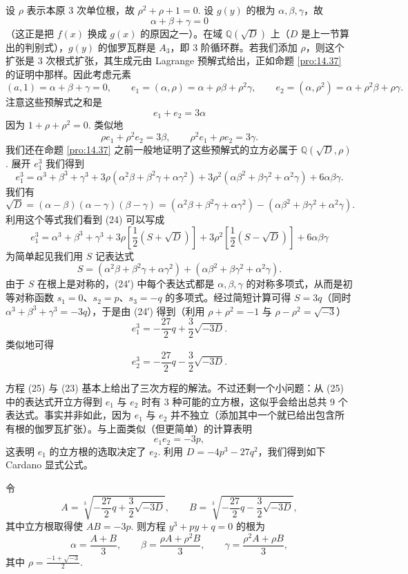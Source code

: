 设 \(\rho\) 表示本原 3 次单位根，故 \(\rho^2+\rho+1 = 0\). 设 \(g(y)\) 的根为 \(\alpha, \beta, \gamma\)，故
\[
\alpha+\beta+\gamma = 0
\]
（这正是把 \(f(x)\) 换成 \(g(x)\) 的原因之一）。在域 \(\mathbb{Q}(\sqrt{D})\) 上（\(D\) 是上一节算出的判别式），\(g(y)\) 的伽罗瓦群是 \(A_3\)，即 3 阶循环群。若我们添加 \(\rho\)，则这个扩张是 3 次根式扩张，其生成元由 Lagrange 预解式给出，正如命题 \ref{pro:14.37} 的证明中那样。因此考虑元素
\[
(a, 1) = \alpha+\beta+\gamma = 0, \qquad e_1 = (\alpha,\rho) = \alpha+\rho\beta+\rho^2\gamma, \qquad e_2 = (\alpha,\rho^2) = \alpha+\rho^2\beta+\rho\gamma.
\]
注意这些预解式之和是
\[
e_1+e_2 = 3\alpha \tag{14.23}
\]
因为 \(1+\rho+\rho^2 = 0\). 类似地
\[
\rho e_1+\rho^2e_2 = 3\beta, \qquad \rho^2e_1+\rho e_2 = 3\gamma. \tag{14.23′}
\]
我们还在命题 \ref{pro:14.37} 之前一般地证明了这些预解式的立方必属于 \(\mathbb{Q}(\sqrt{D}, \rho)\). 展开 \(e_1^3\) 我们得到
\[
e_1^3 = \alpha^3+\beta^3+\gamma^3+3\rho(\alpha^2\beta+\beta^2\gamma+\alpha\gamma^2)+3\rho^2(\alpha\beta^2+\beta\gamma^2+\alpha^2\gamma)+6\alpha\beta\gamma. \tag{14.24}
\]
我们有
\[
\sqrt{D} = (\alpha-\beta)(\alpha-\gamma)(\beta-\gamma) = (\alpha^2\beta+\beta^2\gamma+\alpha\gamma^2)-(\alpha\beta^2+\beta\gamma^2+\alpha^2\gamma).
\]
利用这个等式我们看到 (24) 可以写成
\[
e_1^3 = \alpha^3+\beta^3+\gamma^3+3\rho\left[\frac{1}{2}(S+\sqrt{D})\right]+3\rho^2\left[\frac{1}{2}(S-\sqrt{D})\right]+6\alpha\beta\gamma \tag{14.24′}
\]
为简单起见我们用 \(S\) 记表达式
\[
S = (\alpha^2\beta+\beta^2\gamma+\alpha\gamma^2)+(\alpha\beta^2+\beta\gamma^2+\alpha^2\gamma).
\]
由于 \(S\) 在根上是对称的，(24′) 中每个表达式都是 \(\alpha, \beta, \gamma\) 的对称多项式，从而是初等对称函数 \(s_1 = 0\)、\(s_2 = p\)、\(s_3 = -q\) 的多项式。经过简短计算可得 \(S = 3q\)（同时 \(\alpha^3+\beta^3+\gamma^3 = -3q\)），于是由 (24′) 得到（利用 \(\rho+\rho^2 = -1\) 与 \(\rho-\rho^2 = \sqrt{-3}\)）
\[
e_1^3 = -\frac{27}{2}q+\frac{3}{2}\sqrt{-3D}. \tag{14.25}
\]
类似地可得
\[
e_2^3 = -\frac{27}{2}q-\frac{3}{2}\sqrt{-3D}. \tag{14.25′}
\]

方程 (25) 与 (23) 基本上给出了三次方程的解法。不过还剩一个小问题：从 (25) 中的表达式开立方得到 \(e_1\) 与 \(e_2\) 时有 3 种可能的立方根，这似乎会给出总共 9 个表达式。事实并非如此，因为 \(e_1\) 与 \(e_2\) 并不独立（添加其中一个就已给出包含所有根的伽罗瓦扩张）。与上面类似（但更简单）的计算表明
\[
e_1e_2 = -3p, \tag{14.26}
\]
这表明 \(e_1\) 的立方根的选取决定了 \(e_2\). 利用 \(D = -4p^3-27q^2\)，我们得到如下 Cardano 显式公式。

令
\[
A = \sqrt[3]{-\frac{27}{2}q+\frac{3}{2}\sqrt{-3D}}, \qquad B = \sqrt[3]{-\frac{27}{2}q-\frac{3}{2}\sqrt{-3D}},
\]
其中立方根取得使 \(AB = -3p\). 则方程 \(y^3+py+q = 0\) 的根为
\[
\alpha = \frac{A+B}{3}, \qquad \beta = \frac{\rho A+\rho^2 B}{3}, \qquad \gamma = \frac{\rho^2A+\rho B}{3}, \tag{14.27}
\]
其中 \(\rho = \frac{-1+\sqrt{-3}}{2}\).


